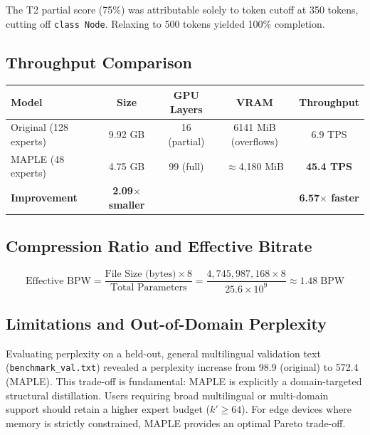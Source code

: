 \documentclass[final]{article}
\newcommand{\MAPLE}{\textsc{MAPLE}}
\newcommand{\bpw}{\text{BPW}}
\begin{document}
The T2 partial score (75\%) was attributable solely to token cutoff at 350 tokens, cutting off \texttt{class Node}. Relaxing to 500 tokens yielded 100\% completion.

\subsection{Throughput Comparison}

\begin{center}
\begin{tabular}{lcccc}
\toprule
\textbf{Model} & \textbf{Size} & \textbf{GPU Layers} & \textbf{VRAM} & \textbf{Throughput} \\
\midrule
Original (128 experts) & 9.92 GB & 16 (partial) & 6141 MiB (overflows) & 6.9 TPS \\
\MAPLE{} (48 experts) & 4.75 GB & 99 (full) & $\approx$4,180 MiB & \textbf{45.4 TPS} \\
\midrule
\textbf{Improvement} & \textbf{2.09$\times$ smaller} & & & \textbf{6.57$\times$ faster} \\
\bottomrule
\end{tabular}
\end{center}

\subsection{Compression Ratio and Effective Bitrate}

\begin{equation}
\text{Effective BPW} = \frac{\text{File Size (bytes)} \times 8}{\text{Total Parameters}} = \frac{4{,}745{,}987{,}168 \times 8}{25.6 \times 10^9} \approx \mathbf{1.48} \; \bpw
\end{equation}

\subsection{Limitations and Out-of-Domain Perplexity}

Evaluating perplexity on a held-out, general multilingual validation text (\texttt{benchmark\_val.txt}) revealed a perplexity increase from 98.9 (original) to 572.4 (\MAPLE{}). This trade-off is fundamental: \MAPLE{} is explicitly a domain-targeted structural distillation. Users requiring broad multilingual or multi-domain support should retain a higher expert budget ($k' \ge 64$). For edge devices where memory is strictly constrained, \MAPLE{} provides an optimal Pareto trade-off.
\end{document}
